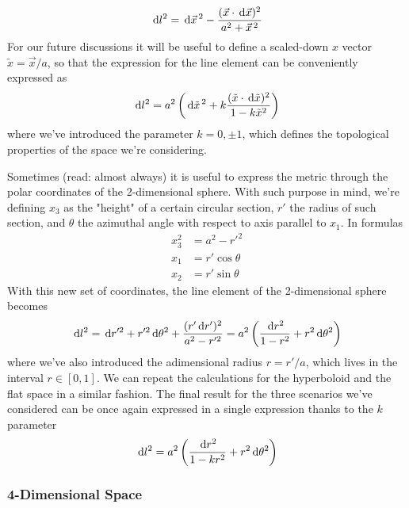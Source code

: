 \begin{equation}
    \,\text{d}l^{2} = \,\text{d}\vec{x}^{\,2} - \frac{(\vec{x}\cdot\,\text{d}\vec{x})^{2}}{a^{2}+\vec{x}^{\,2}}
\end{equation}
For our future discussions it will be useful to define a scaled-down $x$ vector $\tilde{x} = \vec{x}/a$, so that the expression for the line element can be conveniently expressed as
\begin{equation}
    \,\text{d}l^{2} = a^{2}\left(\,\text{d}\tilde{x}^{\,2} + k \frac{(\tilde{x}\cdot\,\text{d}\tilde{x})^{2}}{1-k\tilde{x}^{2}}\right)
    \label{eq:usefulcompact}
\end{equation}
where we've introduced the parameter $k = 0, \pm 1$, which defines the topological properties of the space we're considering.
\par Sometimes (read: almost always) it is useful to express the metric through the polar coordinates of the 2-dimensional sphere. With such purpose in mind, we're defining $x_{3}$ as the "height" of a certain circular section, $r'$ the radius of such section, and $\theta$ the azimuthal angle with respect to axis parallel to $x_{1}$. In formulas
\begin{align*}
    x_{3}^{2} &= a^{2}-r'^{2}\\
    x_{1} &= r'\cos\theta\\
    x_{2} &= r'\sin\theta
\end{align*}
With this new set of coordinates, the line element of the 2-dimensional sphere becomes
\begin{equation}
    \,\text{d}l^{2} = \,\text{d}r'^{2} + r'^{2}\,\text{d}\theta^{2} + \frac{(r'\,\text{d}r')^{2}}{a^{2}-r'^{2}} = a^{2}\left(\frac{\,\text{d}r^{2}}{1-r^{2}} + r^{2}\,\text{d}\theta^{2}\right)
\end{equation}
where we've also introduced the adimensional radius $r = r'/a$, which lives in the interval $r \in [0,1]$. We can repeat the calculations for the hyperboloid and the flat space in a similar fashion. The final result for the three scenarios we've considered can be once again expressed in a single expression thanks to the $k$ parameter
\begin{equation}
    \,\text{d}l^{2} = a^{2}\left(\frac{\,\text{d}r^{2}}{1-kr^{2}}+r^{2}\,\text{d}\theta^{2}\right)
\end{equation}

\subsubsection*{4-Dimensional Space}

